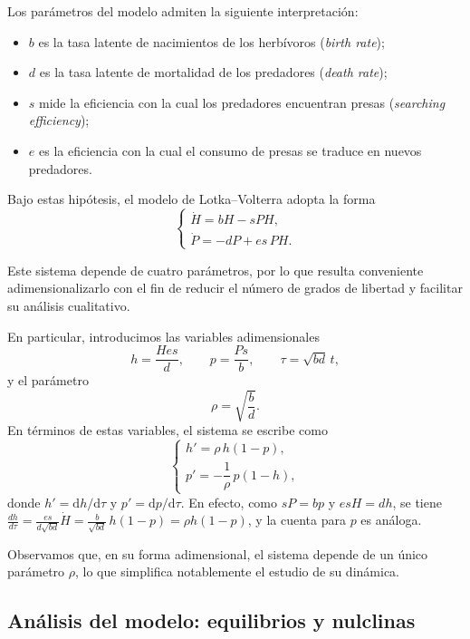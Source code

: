 \documentclass[12pt, a4paper]{amsbook}
\theoremstyle{remark}
\theoremstyle{definition}
\numberwithin{section}{chapter}
\numberwithin{subsection}{section}
\numberwithin{equation}{section}
\numberwithin{figure}{chapter}
\begin{document}
Los parámetros del modelo admiten la siguiente interpretación:
\begin{itemize}
\item $b$ es la tasa latente de nacimientos de los herbívoros (\emph{birth rate});

\item $d$ es la tasa latente de mortalidad de los predadores (\emph{death rate});

\item $s$ mide la eficiencia con la cual los predadores encuentran presas (\emph{searching efficiency});

\item $e$ es la eficiencia con la cual el consumo de presas se traduce en nuevos predadores.
\end{itemize}

Bajo estas hipótesis, el modelo de Lotka--Volterra adopta la forma
$$
\begin{cases}
\dot H = bH - sPH,\\[4pt]
\dot P = -dP + es\,PH.
\end{cases}
$$

Este sistema depende de cuatro parámetros, por lo que resulta conveniente adimensionalizarlo con el fin de reducir el número de grados de libertad y facilitar su análisis cualitativo.


En particular, introducimos las variables adimensionales
$$
h = \frac{Hes}{d}, \qquad p = \frac{Ps}{b}, \qquad \tau = \sqrt{bd}\, t,
$$
y el parámetro
$$
\rho = \sqrt{\frac{b}{d}}.
$$
En términos de estas variables, el sistema se escribe como
\begin{equation}\label{LV1}
\begin{cases}
h' = \rho\, h(1 - p),\\[4pt]
p' = -\dfrac{1}{\rho}\, p(1 - h),
\end{cases}
\end{equation}
donde $h' = \mathrm{d}h/\mathrm{d}\tau$ y $p' = \mathrm{d}p/\mathrm{d}\tau$. En efecto, como $sP=bp$ y $esH=dh$, se tiene $\frac{dh}{d\tau} = \frac{es}{d\sqrt{bd}}\dot H = \frac{b}{\sqrt{bd}}\,h(1-p) = \rho h(1-p)$, y la cuenta para $p$ es análoga.


Observamos que, en su forma adimensional, el sistema depende de un único parámetro $\rho$, lo que simplifica notablemente el estudio de su dinámica.

\subsection{Análisis del modelo: equilibrios y nulclinas}\label{sec:LV1-analisis}
\end{document}
